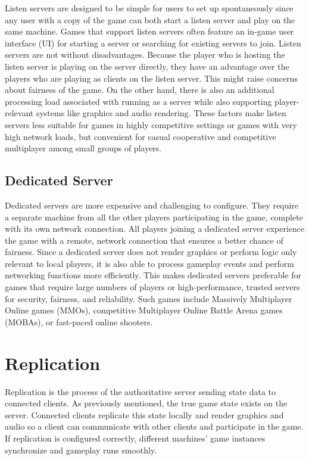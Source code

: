 \documentclass[
  letterpaper,
  DIV=11,
  numbers=noendperiod]{scrartcl}
\begin{document}
Listen servers are designed to be simple for users to set up
spontaneously since any user with a copy of the game can both start a
listen server and play on the same machine. Games that support listen
servers often feature an in-game user interface (UI) for starting a
server or searching for existing servers to join. Listen servers are not
without disadvantages. Because the player who is hosting the listen
server is playing on the server directly, they have an advantage over
the players who are playing as clients on the listen server. This might
raise concerns about fairness of the game. On the other hand, there is
also an additional processing load associated with running as a server
while also supporting player-relevant systems like graphics and audio
rendering. These factors make listen servers less suitable for games in
highly competitive settings or games with very high network loads, but
convenient for casual cooperative and competitive multiplayer among
small groups of players.

\subsection{Dedicated Server}\label{dedicated-server}

Dedicated servers are more expensive and challenging to configure. They
require a separate machine from all the other players participating in
the game, complete with its own network connection. All players joining
a dedicated server experience the game with a remote, network connection
that ensures a better chance of fairness. Since a dedicated server does
not render graphics or perform logic only relevant to local players, it
is also able to process gameplay events and perform networking functions
more efficiently. This makes dedicated servers preferable for games that
require large numbers of players or high-performance, trusted servers
for security, fairness, and reliability. Such games include Massively
Multiplayer Online games (MMOs), competitive Multiplayer Online Battle
Arena games (MOBAs), or fast-paced online shooters.

\section{Replication}\label{replication}

Replication is the process of the authoritative server sending state
data to connected clients. As previously mentioned, the true game state
exists on the server. Connected clients replicate this state locally and
render graphics and audio so a client can communicate with other clients
and participate in the game. If replication is configured correctly,
different machines' game instances synchronize and gameplay runs
smoothly.
\end{document}
